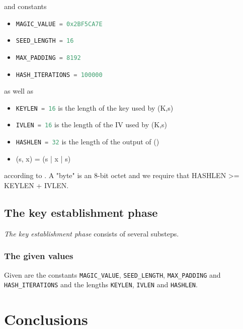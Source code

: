 \documentclass[sigconf, screen]{acmart}
\begin{document}
and constants
\begin{itemize}
    \item \lstinline[language=C]{MAGIC_VALUE = 0x2BF5CA7E}
    \item \lstinline[language=C]{SEED_LENGTH = 16}
    \item \lstinline[language=C]{MAX_PADDING = 8192}
    \item \lstinline[language=C]{HASH_ITERATIONS = 100000}
\end{itemize}

as well as
\begin{itemize}
    \item \lstinline[language=C]{KEYLEN = 16} is the length of the key used by \enc(K,s)
    \item \lstinline[language=C]{IVLEN = 16} is the length of the IV used by \enc(K,s)
    \item \lstinline[language=C]{HASHLEN = 32} is the length of the output of \hash()
    \item \mac(s, x) = \hash(s | x | s)
\end{itemize}

according to \cite{TorGitWebObfs2Specification}. A "byte" is an 8-bit octet and we require that HASHLEN >= KEYLEN + IVLEN.
\subsection{The key establishment phase}
\label{ss:theKeyestablishmentphase}
\textit{The key establishment phase} consists of several substeps.
\subsubsection{The given values}
\label{sss:thegivenvalues}
Given are the constants \lstinline[language=C]{MAGIC_VALUE}, \lstinline[language=C]{SEED_LENGTH}, \lstinline[language=C]{MAX_PADDING} and \lstinline[language=C]{HASH_ITERATIONS} and the lengths \lstinline[language=C]{KEYLEN}, \lstinline[language=C]{IVLEN} and \lstinline[language=C]{HASHLEN}.
\section{Conclusions}
\label{s:conclusions}
\appendix
\end{document}
